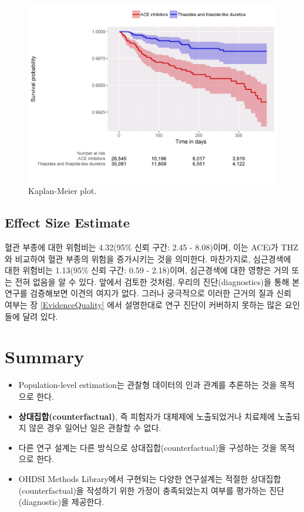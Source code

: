 \documentclass[11pt]{book}
\theoremstyle{definition}
\theoremstyle{definition}
\theoremstyle{definition}
\theoremstyle{remark}
\let\BeginKnitrBlock\begin \let\EndKnitrBlock\end
\begin{document}
\begin{figure}

{\centering \includegraphics[width=1\linewidth]{images/PopulationLevelEstimation/kmPlot} 

}

\caption{Kaplan-Meier plot.}\label{fig:kmPlot}
\end{figure}

\subsection{Effect Size Estimate}\label{effect-size-estimate}

혈관 부종에 대한 위험비는 4.32(95\% 신뢰 구간: 2.45 - 8.08)이며, 이는
ACEi가 THZ와 비교하여 혈관 부종의 위험을 증가시키는 것을 의미한다.
마찬가지로, 심근경색에 대한 위험비는 1.13(95\% 신뢰 구간: 0.59 -
2.18)이며, 심근경색에 대한 영향은 거의 또는 전혀 없음을 알 수 있다.
앞에서 검토한 것처럼, 우리의 진단(diagnostics)을 통해 본 연구를
검증해보면 이견의 여지가 없다. 그러나 궁극적으로 이러한 근거의 질과 신뢰
여부는 장 \ref{EvidenceQuality} 에서 설명한대로 연구 진단이 커버하지
못하는 많은 요인들에 달려 있다.

\section{Summary}\label{summary-6}

\BeginKnitrBlock{rmdsummary}
\begin{itemize}
\item
  Population-level estimation는 관찰형 데이터의 인과 관계를 추론하는
  것을 목적으로 한다.
\item
  \textbf{상대집합(counterfactual)}, 즉 피험자가 대체제에 노출되었거나
  치료제에 노출되지 않은 경우 일어난 일은 관찰할 수 없다.
\item
  다른 연구 설계는 다른 방식으로 상대집합(counterfactual)을 구성하는
  것을 목적으로 한다.
\item
  OHDSI Methods Library에서 구현되는 다양한 연구설계는 적절한
  상대집합(counterfactual)을 작성하기 위한 가정이 충족되었는지 여부를
  평가하는 진단 (diagnostic)을 제공한다.
\end{itemize}
\EndKnitrBlock{rmdsummary}
\end{document}
